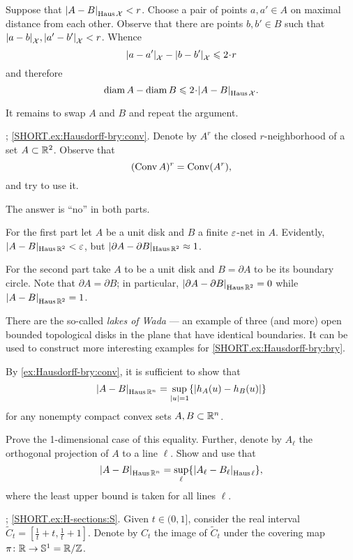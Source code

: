 \setcounter{eqtn}{0}

Suppose that $\dist{A}{B}{\Haus\spc{X}}<r$.
Choose a pair of points $a,a'\in A$ on maximal distance from each other.
Observe that there are points $b,b'\in B$ such that 
$\dist{a}{b}{\spc{X}},\dist{a'}{b'}{\spc{X}}<r$.
Whence 
\[\dist{a}{a'}{\spc{X}}-\dist{b}{b'}{\spc{X}}\le 2\cdot r\]
and therefore
\[\diam A-\diam B\le 2\cdot\dist{A}{B}{\Haus\spc{X}}.\]

It remains to swap $A$ and $B$ and repeat the argument.


\parbf{\ref{ex:Hausdorff-bry}}; \ref{SHORT.ex:Hausdorff-bry:conv}.
Denote by $A^r$ the closed $r$-neighborhood of a set $A\z\subset \RR^2$.
Observe  that 
\[(\mathop{\rm Conv}\nolimits A)^r=\mathop{\rm Conv}\nolimits(A^r),\]
and try to use it.

The answer is ``no'' in both parts.

For the first part let $A$ be a unit disk and $B$ a finite $\varepsilon$-net in $A$.
Evidently, $|A-B|_{\operatorname{\rm Haus}\nolimits\mathbb{R}^2}<\varepsilon$, 
but
$|\partial A-\partial B|_{\operatorname{\rm Haus}\nolimits\mathbb{R}^2}\approx 1$.

For the second part take $A$ to be a unit disk and $B=\partial A$ to be its boundary circle.
Note that $\partial A=\partial B$; in particular, $\dist{\partial A}{\partial B}{\Haus\RR^2}=0$ while $\dist{ A}{B}{\Haus\RR^2}=1$.

There are the so-called {}\emph{lakes of Wada} --- an example of three (and more) open bounded topological disks in the plane that have identical boundaries.
It can be used to construct more interesting examples for \ref{SHORT.ex:Hausdorff-bry:bry}.

\parbf{\ref{ex:Haus-support}} By \ref{ex:Hausdorff-bry:conv}, it is sufficient to show that  
\[\dist{A}{B}{\Haus\RR^n}= \sup_{|u|=1}\{|h_A(u)-h_B(u)|\}\]
for any nonempty compact convex sets $A,B\subset \mathbb{R}^n$.

Prove the 1-dimensional case of this equality.
Further, denote by $A_\ell$ the orthogonal projection of $A$ to a line $\ell$.
Show and use that
\[\dist{A}{B}{\Haus\RR^n}=\sup_\ell\{\dist{A_\ell}{B_\ell}{\Haus\ell}\},\]
where the least upper bound is taken for all lines $\ell$.

\parbf{\ref{ex:H-sections}};
\ref{SHORT.ex:H-sections:S}.
Given $t\in (0,1]$, consider the real interval $\tilde C_t=[\tfrac 1t+t, \tfrac 1t+1]$.
Denote by $C_t$ the image of $\tilde C_t$ under the covering map $\pi\:\RR\to \mathbb{S}^1\z=\RR/\ZZ$.

